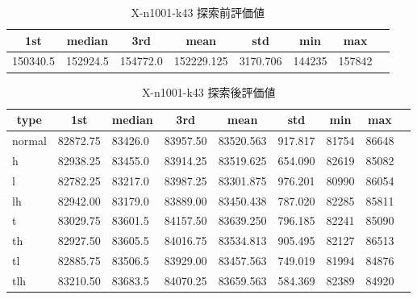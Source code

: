 \begin{table}[htbp]
    \caption{X-n1001-k43 探索前評価値}
    \begin{tabular}{|l|l|l|l|l|l|l|l|}\hline
    \multicolumn{1}{|c|}{\textbf{1st}}
    &\multicolumn{1}{c|}{\textbf{median}}
    &\multicolumn{1}{c|}{\textbf{3rd}}
    &\multicolumn{1}{c|}{\textbf{mean}}
    &\multicolumn{1}{c|}{\textbf{std}}
    &\multicolumn{1}{c|}{\textbf{min}}
    &\multicolumn{1}{c|}{\textbf{max}}\\\hline
	150340.5 & 152924.5 & 154772.0 & 152229.125 & 3170.706 & 144235 & 157842\\\hline
	\end{tabular}
\end{table}
\begin{table}[htbp]
    \caption{X-n1001-k43 探索後評価値}
    \begin{tabular}{|l|l|l|l|l|l|l|l|l|}\hline
    \multicolumn{1}{|c|}{\textbf{type}}
    &\multicolumn{1}{|c|}{\textbf{1st}}
    &\multicolumn{1}{c|}{\textbf{median}}
    &\multicolumn{1}{c|}{\textbf{3rd}}
    &\multicolumn{1}{c|}{\textbf{mean}}
    &\multicolumn{1}{c|}{\textbf{std}}
    &\multicolumn{1}{c|}{\textbf{min}}
    &\multicolumn{1}{c|}{\textbf{max}}\\\hline
	normal & 82872.75 & 83426.0 & 83957.50 & 83520.563 & 917.817 & 81754 & 86648\\\hline
	h & 82938.25 & 83455.0 & 83914.25 & 83519.625 & 654.090 & 82619 & 85082\\\hline
	l & 82782.25 & 83217.0 & 83987.25 & 83301.875 & 976.201 & 80990 & 86054\\\hline
	lh & 82942.00 & 83179.0 & 83889.00 & 83450.438 & 787.020 & 82285 & 85811\\\hline
	t & 83029.75 & 83601.5 & 84157.50 & 83639.250 & 796.185 & 82241 & 85090\\\hline
	th & 82927.50 & 83605.5 & 84016.75 & 83534.813 & 905.495 & 82127 & 86513\\\hline
	tl & 82885.75 & 83506.5 & 83929.00 & 83457.563 & 749.019 & 81994 & 84876\\\hline
	tlh & 83210.50 & 83683.5 & 84070.25 & 83659.563 & 584.369 & 82389 & 84920\\\hline
	\end{tabular}
\end{table}
